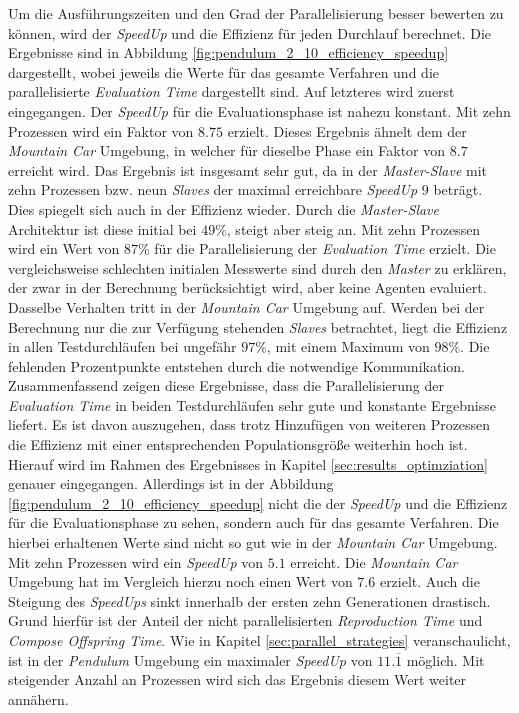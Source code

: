 Um die Ausführungszeiten und den Grad der Parallelisierung besser bewerten zu können, wird der \emph{SpeedUp} und die Effizienz für jeden Durchlauf berechnet. Die Ergebnisse sind in Abbildung \ref{fig:pendulum_2_10_efficiency_speedup} dargestellt, wobei jeweils die Werte für das gesamte Verfahren und die parallelisierte \emph{Evaluation Time} dargestellt sind. Auf letzteres wird zuerst eingegangen. Der \emph{SpeedUp} für die Evaluationsphase ist nahezu konstant. Mit zehn Prozessen wird ein Faktor von $8.75$ erzielt. Dieses Ergebnis ähnelt dem der \emph{Mountain Car} Umgebung, in welcher für dieselbe Phase ein Faktor von $8.7$ erreicht wird. Das Ergebnis ist insgesamt sehr gut, da in der \emph{Master-Slave} mit zehn Prozessen bzw. neun \emph{Slaves} der maximal erreichbare \emph{SpeedUp} $9$ beträgt. Dies spiegelt sich auch in der Effizienz wieder. Durch die \emph{Master-Slave} Architektur ist diese initial bei $49\%$, steigt aber steig an. Mit zehn Prozessen wird ein Wert von $87\%$ für die Parallelisierung der \emph{Evaluation Time} erzielt. Die vergleichsweise schlechten initialen Messwerte sind durch den \emph{Master} zu erklären, der zwar in der Berechnung berücksichtigt wird, aber keine Agenten evaluiert. Dasselbe Verhalten tritt in der \emph{Mountain Car} Umgebung auf. Werden bei der Berechnung nur die zur Verfügung stehenden \emph{Slaves} betrachtet, liegt die Effizienz in allen Testdurchläufen bei ungefähr $97\%$, mit einem Maximum von $98\%$. Die fehlenden Prozentpunkte entstehen durch die notwendige Kommunikation. Zusammenfassend zeigen diese Ergebnisse, dass die Parallelisierung der \emph{Evaluation Time} in beiden Testdurchläufen sehr gute und konstante Ergebnisse liefert. Es ist davon auszugehen, dass trotz Hinzufügen von weiteren Prozessen die Effizienz mit einer entsprechenden Populationsgröße weiterhin hoch ist. Hierauf wird im Rahmen des Ergebnisses in Kapitel \ref{sec:results_optimziation} genauer eingegangen. Allerdings ist in der Abbildung \ref{fig:pendulum_2_10_efficiency_speedup} nicht die der \emph{SpeedUp} und die Effizienz für die Evaluationsphase zu sehen, sondern auch für das gesamte Verfahren. Die hierbei erhaltenen Werte sind nicht so gut wie in der \emph{Mountain Car} Umgebung. Mit zehn Prozessen wird ein \emph{SpeedUp} von $5.1$ erreicht. Die \emph{Mountain Car} Umgebung hat im Vergleich hierzu noch einen Wert von $7.6$ erzielt. Auch die Steigung des \emph{SpeedUps} sinkt innerhalb der ersten zehn Generationen drastisch. Grund hierfür ist der Anteil der nicht parallelisierten \emph{Reproduction Time} und \emph{Compose Offspring Time}. Wie in Kapitel \ref{sec:parallel_strategies} veranschaulicht, ist in der \emph{Pendulum} Umgebung ein maximaler \emph{SpeedUp} von $11.\overline{1}$ möglich. Mit steigender Anzahl an Prozessen wird sich das Ergebnis diesem Wert weiter annähern. 
